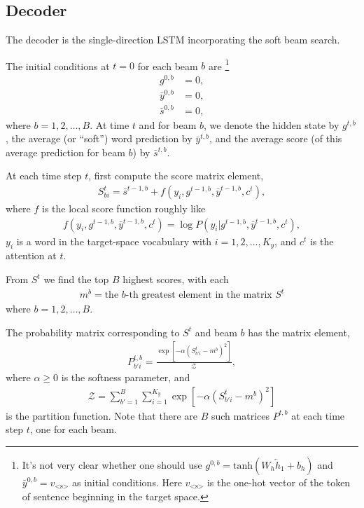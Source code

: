 \documentclass{article}
\begin{document}

\subsection{Decoder}

	The decoder is the single-direction LSTM incorporating the soft beam search.
	
	The initial conditions at $t = 0$ for each beam $b$ are%
		\footnote{It's not very clear whether one should use $g^{0, b} = \textrm{tanh}(W_h \overleftarrow{h}_1 + b_h)$ and $\bar{y}^{0, b} = v_{\textrm{<s>}}$ as initial conditions. Here $v_{\textrm{<s>}}$ is the one-hot vector of the token of sentence beginning in the target space.}
		\begin{align}
			g^{0, b} &= 0, \\
			\bar{y}^{0, b} &= 0, \\
			\bar{s}^{0, b} &= 0,
		\end{align}
		where $b = 1, 2, \dots, B$. At time $t$ and for beam $b$, we denote the hidden state by $g^{t, b}$, the average (or ``soft'') word prediction by $\bar{y}^{t, b}$, and the average score (of this average prediction for beam $b$) by $\bar{s}^{t, b}$.
	
	At each time step $t$, first compute the score matrix element,
		\begin{align}
			S^t_{b i} = \bar{s}^{t-1, b} + f(y_i, g^{t-1, b}, \bar{y}^{t-1, b}, c^t),
		\end{align}
		where $f$ is the local score function roughly like
		\begin{align}
			f(y_i, g^{t-1, b}, \bar{y}^{t-1, b}, c^t) = \log P(y_i | g^{t-1, b}, \bar{y}^{t-1, b}, c^t),
		\end{align}
		$y_i$ is a word in the target-space vocabulary with $i = 1, 2, \dots, K_y$, and $c^t$ is the attention at $t$.

	From $S^t$ we find the top $B$ highest scores, with each
		\begin{align}
			m^{b} = \textrm{the $b$-th greatest element in the matrix $S^t$}
		\end{align}
		where $b = 1, 2, \dots, B$.
	
	The probability matrix corresponding to $S^t$ and beam $b$ has the matrix element,
		\begin{align}
			P^{t, b}_{b' i} = \frac{\exp[-\alpha ( S^t_{b' i} - m^{b} )^2]}{\mathcal{Z}},
		\end{align}
		where $\alpha \geq 0$ is the softness parameter, and
		\begin{align}
			\mathcal{Z} = \sum_{b' = 1}^B \sum_{i = 1}^{K_y} \exp[-\alpha ( S^t_{b' i} - m^{b} )^2]
		\end{align}
		is the partition function. Note that there are $B$ such matrices $P^{t, b}$ at each time step $t$, one for each beam.
\end{document}
